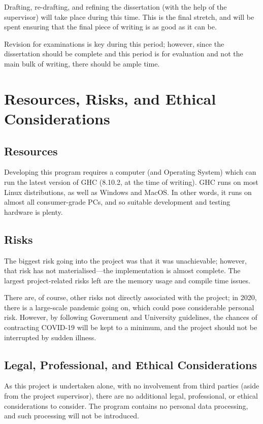 \documentclass[12pt, a4paper]{scrartcl}
\begin{document}
Drafting, re-drafting, and refining the dissertation (with the help of the supervisor) will take place during this time. This is the final stretch, and will be spent ensuring that the final piece of writing is as good as it can be.

Revision for examinations is key during this period; however, since the dissertation should be complete and this period is for evaluation and not the main bulk of writing, there should be ample time.

\section{Resources, Risks, and Ethical Considerations}

\subsection{Resources}

Developing this program requires a computer (and Operating System) which can run the latest version of GHC (8.10.2, at the time of writing). GHC runs on most Linux distributions, as well as Windows and MacOS. In other words, it runs on almost all consumer-grade PCs, and so suitable development and testing hardware is plenty.

\subsection{Risks}

The biggest risk going into the project was that it was unachievable; however, that risk has not materialised---the implementation is almost complete. The largest project-related risks left are the memory usage and compile time issues. 

There are, of course, other risks not directly associated with the project; in 2020, there is a large-scale pandemic going on, which could pose considerable personal risk. However, by following Government and University guidelines, the chances of contracting COVID-19 will be kept to a minimum, and the project should not be interrupted by sudden illness.

\subsection{Legal, Professional, and Ethical Considerations}

As this project is undertaken alone, with no involvement from third parties (aside from the project supervisor), there are no additional legal, professional, or ethical considerations to consider. The program contains no personal data processing, and such processing will not be introduced.




\end{document}
